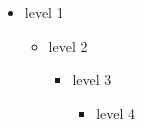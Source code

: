 
    \begin{itemize}
        \item level 1
        \begin{itemize}
            \item level 2
            \begin{itemize}
                \item level 3
                \begin{itemize}
                    \item level 4
                \end{itemize}
            \end{itemize}
        \end{itemize}
    \end{itemize}
